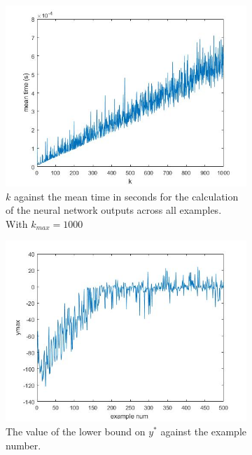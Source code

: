 \documentclass[11pt]{article}
\begin{document}
\begin{figure}
    \centering
    \begin{subfigure}{.5\textwidth} 
        \centering \includegraphics[width=0.8\columnwidth]{Figures/Task1tvk.jpg}
        \caption{\label{fig:Task1a}$k$ against the mean time in seconds for the calculation of the neural network outputs across all examples. With $k_{max}=1000$
        }
    \end{subfigure}%
    \begin{subfigure}{.5\textwidth} 
        \centering \includegraphics[width=0.8\columnwidth]{Figures/Task1yvexample.jpg}
        \caption{\label{fig:Task1b}The value of the lower bound on $y^*$ against the example number.
        }
    \end{subfigure}
    \caption{}
    \label{fig:Task1}
\end{figure}
\end{document}
